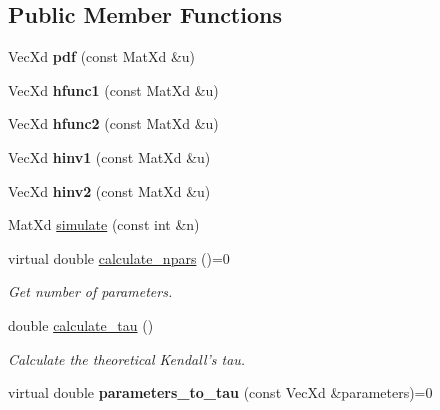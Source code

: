 \subsection*{Public Member Functions}
\begin{DoxyCompactItemize}
\item 
\hypertarget{group__df_gaca43aa1f9f6cf4ee71c5d347bf702c04}{Vec\+Xd {\bfseries pdf} (const Mat\+Xd \&u)}\label{group__df_gaca43aa1f9f6cf4ee71c5d347bf702c04}

\item 
\hypertarget{group__hfunctions_ga67c3d22228770488c70bdf69ee096317}{Vec\+Xd {\bfseries hfunc1} (const Mat\+Xd \&u)}\label{group__hfunctions_ga67c3d22228770488c70bdf69ee096317}

\item 
\hypertarget{group__hfunctions_ga2aaa33ca89f748cba38c28e3e0ab92c3}{Vec\+Xd {\bfseries hfunc2} (const Mat\+Xd \&u)}\label{group__hfunctions_ga2aaa33ca89f748cba38c28e3e0ab92c3}

\item 
\hypertarget{group__hfunctions_ga61e9a1af49a11fdf215ab74a544ce955}{Vec\+Xd {\bfseries hinv1} (const Mat\+Xd \&u)}\label{group__hfunctions_ga61e9a1af49a11fdf215ab74a544ce955}

\item 
\hypertarget{group__hfunctions_ga36fddab47d9b8291ddaeaf5735ca24da}{Vec\+Xd {\bfseries hinv2} (const Mat\+Xd \&u)}\label{group__hfunctions_ga36fddab47d9b8291ddaeaf5735ca24da}

\item 
Mat\+Xd \hyperlink{class_bicop_afa62d40a17e096cc0f7e769fb2a1285d}{simulate} (const int \&n)
\item 
\hypertarget{class_bicop_a21f37d9e51460c13be57e48c3d1e7ba4}{virtual double \hyperlink{class_bicop_a21f37d9e51460c13be57e48c3d1e7ba4}{calculate\+\_\+npars} ()=0}\label{class_bicop_a21f37d9e51460c13be57e48c3d1e7ba4}

\begin{DoxyCompactList}\small\item\em Get number of parameters. \end{DoxyCompactList}\item 
\hypertarget{class_bicop_abe228ece449fb66996f91b0fcfed60d3}{double \hyperlink{class_bicop_abe228ece449fb66996f91b0fcfed60d3}{calculate\+\_\+tau} ()}\label{class_bicop_abe228ece449fb66996f91b0fcfed60d3}

\begin{DoxyCompactList}\small\item\em Calculate the theoretical Kendall's tau. \end{DoxyCompactList}\item 
\hypertarget{class_bicop_aadd4f372b89a2389348893633ec238ba}{virtual double {\bfseries parameters\+\_\+to\+\_\+tau} (const Vec\+Xd \&parameters)=0}\label{class_bicop_aadd4f372b89a2389348893633ec238ba}


\end{DoxyCompactItemize}

